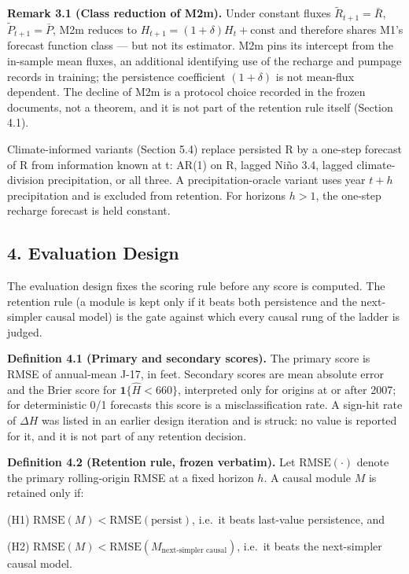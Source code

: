 \documentclass[11pt]{article}
\begin{document}
\textbf{Remark 3.1 (Class reduction of M2m).} Under constant fluxes
\(\tilde R_{t+1}=\bar R\), \(\tilde P_{t+1}=\bar P\), M2m reduces to
\(H_{t+1}=(1+\delta)H_t+\mathrm{const}\) and therefore shares M1's
forecast function class --- but not its estimator. M2m pins its
intercept from the in-sample mean fluxes, an additional identifying use
of the recharge and pumpage records in training; the persistence
coefficient \((1+\delta)\) is not mean-flux dependent. The decline of
M2m is a protocol choice recorded in the frozen documents, not a
theorem, and it is not part of the retention rule itself (Section 4.1).

Climate-informed variants (Section 5.4) replace persisted R by a
one-step forecast of R from information known at t: AR(1) on R, lagged
Niño 3.4, lagged climate-division precipitation, or all three. A
precipitation-oracle variant uses year \(t+h\) precipitation and is
excluded from retention. For horizons \(h>1\), the one-step recharge
forecast is held constant.

\subsection{4. Evaluation Design}\label{evaluation-design}

The evaluation design fixes the scoring rule before any score is
computed. The retention rule (a module is kept only if it beats both
persistence and the next-simpler causal model) is the gate against which
every causal rung of the ladder is judged.

\textbf{Definition 4.1 (Primary and secondary scores).} The primary
score is RMSE of annual-mean J-17, in feet. Secondary scores are mean
absolute error and the Brier score for \(\mathbf{1}\{\hat H < 660\}\),
interpreted only for origins at or after 2007; for deterministic 0/1
forecasts this score is a misclassification rate. A sign-hit rate of
\(\Delta H\) was listed in an earlier design iteration and is struck: no
value is reported for it, and it is not part of any retention decision.

\textbf{Definition 4.2 (Retention rule, frozen verbatim).} Let
\(\mathrm{RMSE}(\cdot)\) denote the primary rolling-origin RMSE at a
fixed horizon \(h\). A causal module \(M\) is retained only if:

(H1) \(\mathrm{RMSE}(M) < \mathrm{RMSE}(\text{persist})\), i.e.~it beats
last-value persistence, and

(H2)
\(\mathrm{RMSE}(M) < \mathrm{RMSE}(M_{\text{next-simpler causal}})\),
i.e.~it beats the next-simpler causal model.
\end{document}
